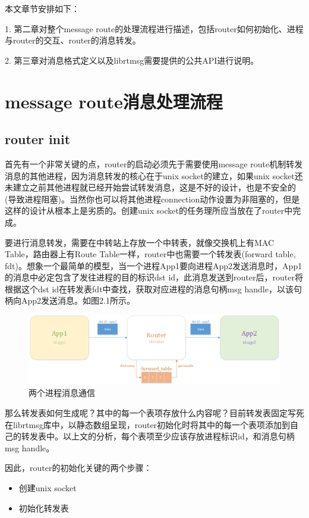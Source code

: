 \documentclass[a4paper,11pt,oneside]{ctexbook}
\begin{document}
本文章节安排如下：

1. 第二章对整个message route的处理流程进行描述，包括router如何初始化、进程与router的交互、router的消息转发。

2. 第三章对消息格式定义以及librtmsg需要提供的公共API进行说明。

\chapter{message route消息处理流程}

\section{router init}
首先有一个非常关键的点，router的启动必须先于需要使用message route机制转发消息的其他进程，因为消息转发的核心在于unix socket的建立，如果unix socket还未建立之前其他进程就已经开始尝试转发消息，这是不好的设计，也是不安全的(导致进程阻塞)。当然你也可以将其他进程connection动作设置为非阻塞的，但是这样的设计从根本上是劣质的。创建unix socket的任务理所应当放在了router中完成。

要进行消息转发，需要在中转站上存放一个中转表，就像交换机上有MAC Table，路由器上有Route Table一样，router中也需要一个转发表(forward table, fdt)。想象一个最简单的模型，当一个进程App1要向进程App2发送消息时，App1的消息中必定包含了发往进程的目的标识dst id，此消息发送到router后，router将根据这个dst id在转发表fdt中查找，获取对应进程的消息句柄msg handle，以该句柄向App2发送消息。如图2.1所示。

\begin{figure}[ht]
    \centering
    \includegraphics[width=1\textwidth]{image/message-router-03.jpg}
    \caption{两个进程消息通信}
\end{figure}

那么转发表如何生成呢？其中的每一个表项存放什么内容呢？目前转发表固定写死在librtmsg库中，以静态数组呈现，router初始化时将其中的每一个表项添加到自己的转发表中。以上文的分析，每个表项至少应该存放进程标识id，和消息句柄msg handle。

因此，router的初始化关键的两个步骤：

\begin{itemize}
  \item{创建unix socket}
  \item{初始化转发表}
\end{itemize}
\end{document}

